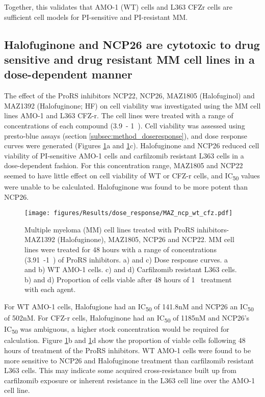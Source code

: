 Together, this validates that AMO-1 (WT) cells and L363 CFZr cells are sufficient cell models for PI-sensitive and PI-resistant MM\@.

\subsection{Halofuginone and NCP26 are cytotoxic to drug sensitive and drug resistant MM cell lines in a dose-dependent manner}
The effect of the ProRS inhibitors NCP22, NCP26, MAZ1805 (Halofuginol) and MAZ1392 (Halofuginone; HF) on cell viability was investigated using the MM cell lines AMO-1 and L363 CFZ-r.
The cell lines were treated with a range of concentrations of each compound (3.9\si{\nano\Molar}- 1\si{\micro\Molar}).
Cell viability was assessed using presto-blue assays (section \ref{subsec:method_doseresponse}), and dose response curves were generated (Figures \ref{fig:dose}a and \ref{fig:dose}c).
Halofuginone and NCP26 reduced cell viability of PI-sensitive AMO-1 cells and carfilzomib resistant L363 cells in a dose-dependent fashion.
For this concentration range, MAZ1805 and NCP22 seemed to have little effect on cell viability of WT or CFZ-r cells, and IC\textsubscript{50} values were unable to be calculated.
Halofuginone was found to be more potent than NCP26.
%
\begin{figure}[h]
\centering
\texttt{[image: figures/Results/dose\_response/MAZ\_ncp\_wt\_cfz.pdf]}
\caption[ProRS inhibitor dose response curves]{Multiple myeloma (MM) cell lines treated with ProRS inhibitors- MAZ1392 (Halofuginone), MAZ1805, NCP26 and NCP22.
MM cell lines were treated for 48 hours with a range of concentrations (3.91\si{\nano\Molar}-1\si{\micro\Molar}) of ProRS inhibitors.
a) and c) Dose response curves.
a and b) WT AMO-1 cells.
c) and d) Carfilzomib resistant L363 cells.
b) and d) Proportion of cells viable after 48 hours of 1\si{\micro\Molar} treatment with each agent.}
\label{fig:dose}
\end{figure}

For WT AMO-1 cells, Halofugione had an IC\textsubscript{50} of 141.8nM and NCP26 an IC\textsubscript{50} of 502nM. For CFZ-r cells, Halofuginone had an IC\textsubscript{50} of 1185nM and NCP26's IC\textsubscript{50} was ambiguous, a higher stock concentration would be required for calculation.
Figure \ref{fig:dose}b and \ref{fig:dose}d show the proportion of viable cells following 48 hours of treatment of the ProRS inhibitors.
WT AMO-1 cells were found to be more sensitive to NCP26 and Halofuginone treatment than carfilzomib resistant L363 cells.
This may indicate some acquired cross-resistance built up from carfilzomib exposure or inherent resistance in the L363 cell line over the AMO-1 cell line.

